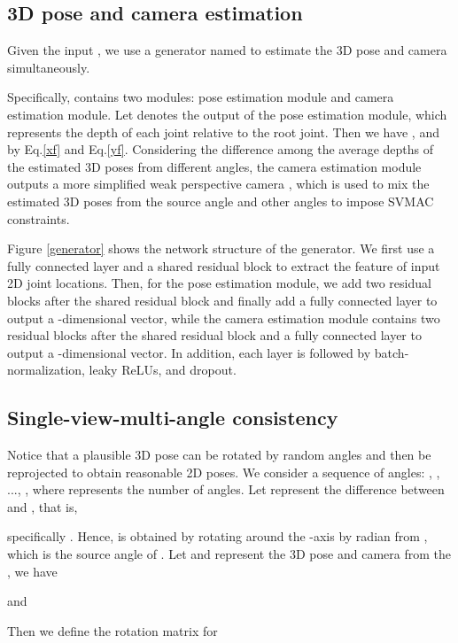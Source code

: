 \documentclass[10pt,twocolumn,letterpaper]{article}
\begin{document}
\subsection{3D pose and camera estimation}
Given the input , we use a generator named  to estimate the 3D pose and camera simultaneously.

Specifically,  contains two modules: pose estimation module and camera estimation module. 
Let  denotes the output of the pose estimation module, which represents the depth of each joint relative to the root joint. Then we have , and  by Eq.\ref{xf} and Eq.\ref{yf}.
Considering the difference among the average depths of the estimated 3D poses from different angles, the camera estimation module outputs a more simplified weak perspective camera , which is used to mix the estimated 3D poses from the source angle and other angles to impose SVMAC constraints. 


Figure \ref{generator} shows the network structure of the generator. We first use a fully connected layer and a shared residual block to extract the feature of input 2D joint locations. Then, for the pose estimation module, we add two residual blocks after the shared residual block and finally add a fully connected layer to output a -dimensional vector, while the camera estimation module contains two residual blocks after the shared residual block and a fully connected layer to output a -dimensional vector. In addition, each layer is followed by batch-normalization\cite{2015Batch}, leaky ReLUs\cite{b_xu_n_wang_t_chen_m_li_empirical_2015}, and dropout\cite{2014Dropout}.

\subsection{Single-view-multi-angle consistency}
\label{svmasec}

Notice that a plausible 3D pose can be rotated by random angles and then be reprojected to obtain reasonable 2D poses. We consider a sequence of angles:
, , ..., ,
where  represents the number of angles. Let  represent the difference between  and ,  that is,

specifically .
Hence, 
is obtained by rotating around the -axis by  radian from , which is the source angle of . Let  and  represent the 3D pose and camera from the , we have





and

Then we define the rotation matrix for 
\end{document}
